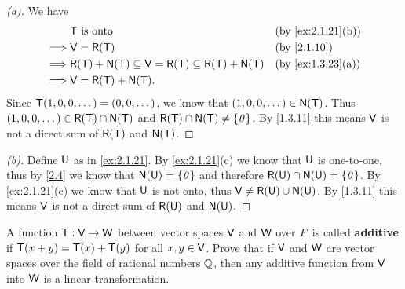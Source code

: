 \begin{proof}[(a)]
  We have
  \begin{align*}
             & \T \text{ is onto}                                                   &  & \text{(by \cref{ex:2.1.21}(b))} \\
    \implies & \V = \rg{\T}                                                         &  & \text{(by \cref{2.1.10})}       \\
    \implies & \rg{\T} + \ns{\T} \subseteq \V = \rg{\T} \subseteq \rg{\T} + \ns{\T} &  & \text{(by \cref{ex:1.3.23}(a))} \\
    \implies & \V = \rg{\T} + \ns{\T}.
  \end{align*}
  Since \(\mathsf{T}(1, 0, 0, \dots) = (0, 0, \dots)\), we know that \((1, 0, 0, \dots) \in \ns{\T}\).
  Thus \((1, 0, 0, \dots) \in \rg{\T} \cap \ns{\T}\) and \(\rg{\T} \cap \ns{\T} \neq \set{\zv}\).
  By \cref{1.3.11} this means \(\mathsf{V}\) is not a direct sum of \(\rg{\T}\) and \(\ns{\T}\).
\end{proof}

\begin{proof}[(b)]
  Define \(\mathsf{U}\) as in \cref{ex:2.1.21}.
  By \cref{ex:2.1.21}(c) we know that \(\mathsf{U}\) is one-to-one, thus by \cref{2.4} we know that \(\ns{\U} = \set{\zv}\) and therefore \(\rg{\U} \cap \ns{\U} = \set{\zv}\).
  By \cref{ex:2.1.21}(c) we know that \(\mathsf{U}\) is not onto, thus \(\V \neq \rg{\U} \cup \ns{\U}\).
  By \cref{1.3.11} this means \(\mathsf{V}\) is not a direct sum of \(\rg{\U}\) and \(\ns{\U}\).
\end{proof}

\begin{ex}\label{ex:2.1.37}
  A function \(\mathsf{T} : \mathsf{V} \to \mathsf{W}\) between vector spaces \(\mathsf{V}\) and \(\mathsf{W}\) over \(\mathit{F}\) is called \textbf{additive} if \(\mathsf{T}(x + y) = \mathsf{T}(x) + \mathsf{T}(y)\) for all \(x, y \in \mathsf{V}\).
  Prove that if \(\mathsf{V}\) and \(\mathsf{W}\) are vector spaces over the field of rational numbers \(\mathbb{Q}\), then any additive function from \(\mathsf{V}\) into \(\mathsf{W}\) is a linear transformation.
\end{ex}

